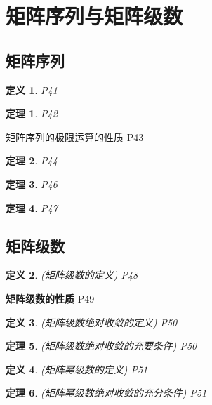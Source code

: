 \documentclass[twoside]{article}
\newtheorem{theorem}{定理}[section]
\newtheorem{definition}{定义}[section]
\begin{document}
\section{矩阵序列与矩阵级数}\label{sec:ju_zhen_xu_lie_yu_ju_zhen_ji_shu_}
  \subsection{矩阵序列}\label{sub:ju_zhen_xu_lie_}
    \begin{definition}
      P41
    \end{definition}

    \begin{theorem}
      P42
    \end{theorem}

    矩阵序列的极限运算的性质 P43

    \begin{theorem}
      P44
    \end{theorem}

    \begin{theorem}
      P46
    \end{theorem}

    \begin{theorem}
      P47
    \end{theorem}

  \subsection{矩阵级数}\label{sub:ju_zhen_ji_shu_}
    \begin{definition}
      (矩阵级数的定义)
      P48
    \end{definition}

    \textbf{矩阵级数的性质} P49

    \begin{definition}
      (矩阵级数绝对收敛的定义) P50
    \end{definition}

    \begin{theorem}
      (矩阵级数绝对收敛的充要条件) P50
    \end{theorem}

    \begin{definition}
      (矩阵幂级数的定义) P51
    \end{definition}

    \begin{theorem}
      (矩阵幂级数绝对收敛的充分条件) P51
    \end{theorem}
\end{document}
